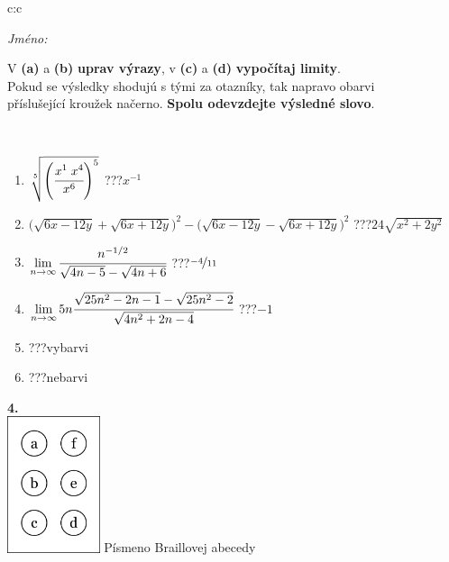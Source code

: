 \documentclass[10pt]{report}
\begin{document}
\begin{tabular}{c:c}
\begin{minipage}[c][104.5mm][t]{0.5\linewidth}
\begin{center}
\textit{Jméno:}\phantom{xxxxxxxxxxxxxxxxxxxxxxxxxxxxxxxxxxxxxxxxxxxxxxxxxxxxxxxxxxxxxxxxx}\\[5mm]
\begin{minipage}{0.95\linewidth}
\begin{center}
V \textbf{(a)} a \textbf{(b)} \textbf{uprav výrazy}, v \textbf{(c)} a \textbf{(d)} \textbf{vypočítaj limity}.\\Pokud se výsledky shodujú s tými za otazníky, tak napravo obarvi\\příslušející kroužek načerno. \textbf{Spolu odevzdejte výsledné slovo}.
\end{center}
\end{minipage}
\\[1mm]
\begin{minipage}{0.79\linewidth}
\begin{center}
\begin{varwidth}{\linewidth}
\begin{enumerate}
\small
\item $\sqrt[5]{\left(\cfrac{x^{1}\;x^{4}}{x^{6}}\right)^{5}}$\quad \dotfill\; ???\;\dotfill \quad $x^{-1}$
\item {\footnotesize{\scriptsize$\big(\sqrt{6x-12y}+\sqrt{6x+12y}\big)^2-\big(\sqrt{6x-12y}-\sqrt{6x+12y}\big)^2$}\quad \dotfill\; ???\;\dotfill \quad $24\sqrt{x^2+2y^2}$}
\item $\lim\limits_{n\to\infty}\cfrac{n^{-1/2}}{\sqrt{4n-5}-\sqrt{4n+6}}$\quad \dotfill\; ???\;\dotfill \quad $\nicefrac{-4}{11}$
\item $\lim\limits_{n\to\infty}5n\cfrac{\sqrt{25n^2-2n-1}-\sqrt{25n^2-2}}{\sqrt{4n^2+2n-4}}$\quad \dotfill\; ???\;\dotfill \quad $-1$
\item \quad \dotfill\; ???\;\dotfill \quad vybarvi
\item \quad \dotfill\; ???\;\dotfill \quad nebarvi
\end{enumerate}
\end{varwidth}
\end{center}
\end{minipage}
\begin{minipage}{0.20\linewidth}
\begin{center}
{\Huge\bfseries 4.} \\[2mm]
\includegraphics[height=40mm]{../images/braille.png}
{\small Písmeno Braillovej abecedy}
\end{center}
\end{minipage}
\end{center}
\end{minipage}
%
\end{tabular}
\end{document}
